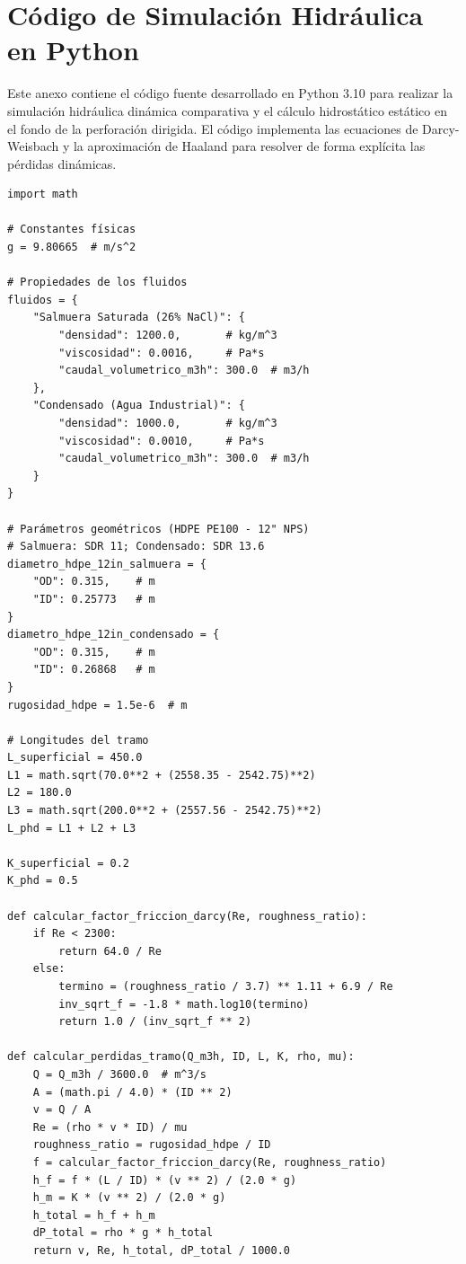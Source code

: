 \appendix
\section{Código de Simulación Hidráulica en Python}
\label{appendix:code}

Este anexo contiene el código fuente desarrollado en Python 3.10 para realizar la simulación hidráulica dinámica comparativa y el cálculo hidrostático estático en el fondo de la perforación dirigida. El código implementa las ecuaciones de Darcy-Weisbach y la aproximación de Haaland para resolver de forma explícita las pérdidas dinámicas.

\begin{verbatim}
import math

# Constantes físicas
g = 9.80665  # m/s^2

# Propiedades de los fluidos
fluidos = {
    "Salmuera Saturada (26% NaCl)": {
        "densidad": 1200.0,       # kg/m^3
        "viscosidad": 0.0016,     # Pa*s
        "caudal_volumetrico_m3h": 300.0  # m3/h
    },
    "Condensado (Agua Industrial)": {
        "densidad": 1000.0,       # kg/m^3
        "viscosidad": 0.0010,     # Pa*s
        "caudal_volumetrico_m3h": 300.0  # m3/h
    }
}

# Parámetros geométricos (HDPE PE100 - 12" NPS)
# Salmuera: SDR 11; Condensado: SDR 13.6
diametro_hdpe_12in_salmuera = {
    "OD": 0.315,    # m
    "ID": 0.25773   # m
}
diametro_hdpe_12in_condensado = {
    "OD": 0.315,    # m
    "ID": 0.26868   # m
}
rugosidad_hdpe = 1.5e-6  # m

# Longitudes del tramo
L_superficial = 450.0
L1 = math.sqrt(70.0**2 + (2558.35 - 2542.75)**2)
L2 = 180.0
L3 = math.sqrt(200.0**2 + (2557.56 - 2542.75)**2)
L_phd = L1 + L2 + L3

K_superficial = 0.2
K_phd = 0.5

def calcular_factor_friccion_darcy(Re, roughness_ratio):
    if Re < 2300:
        return 64.0 / Re
    else:
        termino = (roughness_ratio / 3.7) ** 1.11 + 6.9 / Re
        inv_sqrt_f = -1.8 * math.log10(termino)
        return 1.0 / (inv_sqrt_f ** 2)

def calcular_perdidas_tramo(Q_m3h, ID, L, K, rho, mu):
    Q = Q_m3h / 3600.0  # m^3/s
    A = (math.pi / 4.0) * (ID ** 2)
    v = Q / A
    Re = (rho * v * ID) / mu
    roughness_ratio = rugosidad_hdpe / ID
    f = calcular_factor_friccion_darcy(Re, roughness_ratio)
    h_f = f * (L / ID) * (v ** 2) / (2.0 * g)
    h_m = K * (v ** 2) / (2.0 * g)
    h_total = h_f + h_m
    dP_total = rho * g * h_total
    return v, Re, h_total, dP_total / 1000.0
\end{verbatim}

